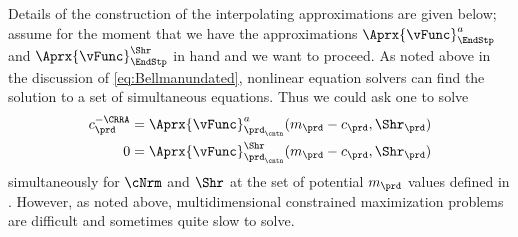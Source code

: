 \documentclass[\econtexRoot/SolvingMicroDSOPs]{subfiles}
\begin{document}
Details of the construction of the interpolating approximations are given below; assume for the moment that we have the approximations $\Aprx{\vFunc}_{\EndStp}^{a}$ and $\Aprx{\vFunc}_{\EndStp}^{\Shr}$ in hand and we want to proceed.  As noted above in the discussion of \eqref{eq:Bellmanundated}, nonlinear equation solvers can find the solution to a set of simultaneous equations.  Thus we could ask one to solve
\begin{equation}\begin{gathered}\begin{aligned}
      c_{\prd}^{-\CRRA}  & = \Aprx{\vFunc}^{a}_{{\prd_\cntn}}(m_{\prd}-c_{\prd},\Shr_{\prd}) %
      \\      0  & = \Aprx{\vFunc}^{\Shr}_{{\prd_\cntn}}(m_{\prd}-c_{\prd},\Shr_{\prd}) \label{eq:FOCwrtw}
    \end{aligned}\end{gathered}\end{equation}
simultaneously for $\cNrm$ and $\Shr$ at the set of potential $m_{\prd}$ values defined in {\mVec}. However, as noted above, multidimensional constrained
maximization problems are difficult and sometimes quite slow to
solve.
\end{document}
